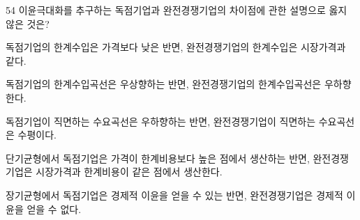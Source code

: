 \begin{question}{54}
이윤극대화를 추구하는 독점기업과 완전경쟁기업의 차이점에 관한 설명으로 옳지 않은 것은?
\begin{choices}
  \item 독점기업의 한계수입은 가격보다 낮은 반면, 완전경쟁기업의 한계수입은 시장가격과 같다.
  \item 독점기업의 한계수입곡선은 우상향하는 반면, 완전경쟁기업의 한계수입곡선은 우하향한다.
  \item 독점기업이 직면하는 수요곡선은 우하향하는 반면, 완전경쟁기업이 직면하는 수요곡선은 수평이다.
  \item 단기균형에서 독점기업은 가격이 한계비용보다 높은 점에서 생산하는 반면, 완전경쟁기업은 시장가격과 한계비용이 같은 점에서 생산한다.
  \item 장기균형에서 독점기업은 경제적 이윤을 얻을 수 있는 반면, 완전경쟁기업은 경제적 이윤을 얻을 수 없다.
\end{choices}
\end{question}
